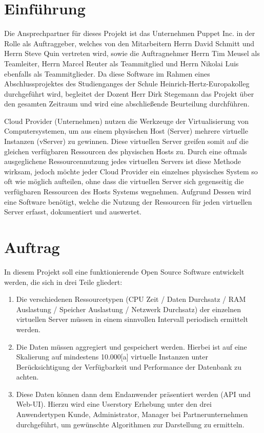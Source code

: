 \section{Einführung}

Die Ansprechpartner für dieses Projekt ist das Unternehmen Puppet Inc. in der
Rolle als Auftraggeber, welches von den Mitarbeitern Herrn David Schmitt und
Herrn Steve Quin vertreten wird, sowie die Auftragnehmer Herrn Tim Meusel als
Teamleiter, Herrn Marcel Reuter als Teammitglied und Herrn Nikolai Luis
ebenfalls als Teammitglieder. Da diese Software im Rahmen eines
Abschlussprojektes des Studienganges der Schule Heinrich-Hertz-Europakolleg
durchgeführt wird, begleitet der Dozent Herr Dirk Stegemann das Projekt über
den gesamten Zeitraum und wird eine abschließende Beurteilung durchführen.

Cloud Provider (Unternehmen) nutzen die Werkzeuge der Virtualisierung von
Computersystemen, um aus einem physischen Host (Server) mehrere virtuelle
Instanzen (vServer) zu gewinnen. Diese virtuellen Server greifen somit auf die
gleichen verfügbaren Ressourcen des physischen Hosts zu. Durch eine oftmals
ausgeglichene Ressourcennutzung jedes virtuellen Servers ist diese Methode
wirksam, jedoch möchte jeder Cloud Provider ein einzelnes physisches System so
oft wie möglich aufteilen, ohne dass die virtuellen Server sich gegenseitig
die verfügbaren Ressourcen des Hosts Systems wegnehmen. Aufgrund Dessen wird
eine Software benötigt, welche die Nutzung der Ressourcen für jeden virtuellen
Server erfasst, dokumentiert und auswertet.


\section{Auftrag}

In diesem Projekt soll eine funktionierende Open Source Software entwickelt
werden, die sich in drei Teile gliedert:
\begin{enumerate}
  \item Die verschiedenen Ressourcetypen (CPU Zeit / Daten Durchsatz / RAM
    Auslastung / Speicher Auslastung / Netzwerk Durchsatz) der einzelnen
    virtuellen Server müssen in einem sinnvollen Intervall periodisch
    ermittelt werden.
  \item Die Daten müssen aggregiert und gespeichert werden. Hierbei ist auf
    eine Skalierung auf mindestens 10.000[a] virtuelle Instanzen unter
    Berücksichtigung der Verfügbarkeit und Performance der Datenbank zu achten.
  \item Diese Daten können dann dem Endanwender präsentiert werden (API und
    Web-UI). Hierzu wird eine Userstory Erhebung unter den drei Anwendertypen
    Kunde, Administrator, Manager bei Partnerunternehmen durchgeführt,
    um gewünschte Algorithmen zur Darstellung zu ermitteln.
\end{enumerate}

